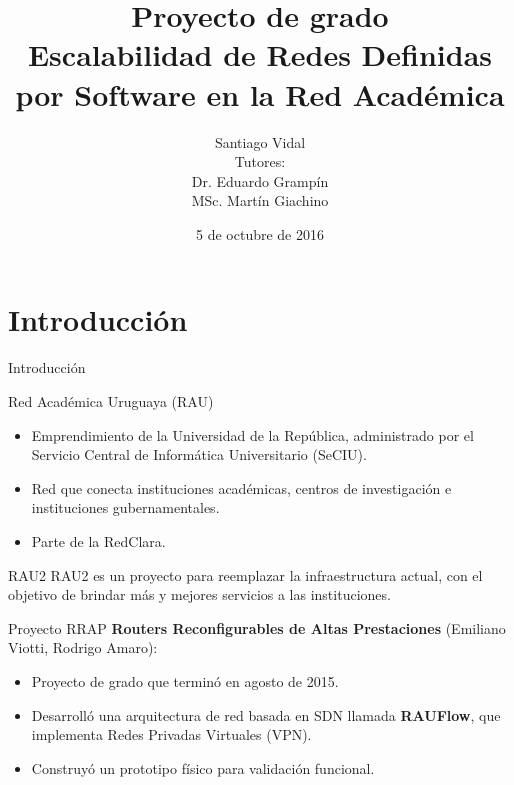\documentclass[xcolor=svgnames]{beamer}
\title
	[Escalabilidad de SDN en la RAU]
  {Proyecto de grado \\
  	Escalabilidad de Redes Definidas por Software en la Red Académica}
\author
	[Santiago Vidal]
  {Santiago Vidal \\
  	\vspace{4mm}
  	{\normalfont\small Tutores: \\
  	Dr. Eduardo Grampín \\
  	MSc. Martín Giachino}}
\date
  {5 de octubre de 2016}
\institute
  [UdelaR]
  {Instituto de Computación \\
  	Facultad de Ingeniería \\
  	Universidad de la República}
\begin{document}
\graphicspath{{Figs/}}

\maketitle

\begin{frame}{}
	\tableofcontents
\end{frame}

\section{Introducción}

\begin{frame}
	\tableofcontents[currentsection]
\end{frame}

\begin{frame}{Introducción}
	\begin{block}{Red Académica Uruguaya (RAU)}
		\begin{itemize}
			\item Emprendimiento de la Universidad de la República, administrado por el Servicio Central de Informática Universitario
			(SeCIU).
			\item Red que conecta instituciones académicas, centros de investigación e instituciones gubernamentales.
			\item Parte de la RedClara.
		\end{itemize}
	\end{block}
	\begin{block}{RAU2}
		RAU2 es un proyecto para reemplazar la infraestructura actual, con el objetivo de brindar más y mejores servicios a las instituciones.
	\end{block}
\end{frame}

\begin{frame}{Proyecto RRAP}
	\textbf{Routers Reconfigurables de Altas Prestaciones} (Emiliano Viotti, Rodrigo Amaro):
	\begin{itemize}
		\item Proyecto de grado que terminó en agosto de 2015.
		\item Desarrolló una arquitectura de red basada en SDN llamada \textbf{RAUFlow}, que implementa Redes Privadas Virtuales (VPN).
		\item Construyó un prototipo físico para validación funcional.
	\end{itemize}
\end{frame}
\end{document}
